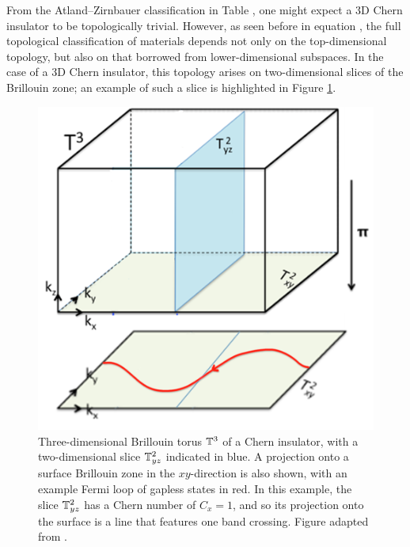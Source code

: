 From the Atland--Zirnbauer classification in Table \red{[reference]},%
one might expect a 3D Chern insulator to be topologically trivial. However, as seen before in equation ,%
the full topological classification of materials depends not only on the top-dimensional topology, but also on that borrowed from lower-dimensional subspaces. In the case of a 3D Chern insulator, this topology arises on two-dimensional slices of the Brillouin zone; an example of such a slice is highlighted in Figure \ref{fig:3D_Chern_insulator}.
\begin{figure}[htb!]
	\centering
	\includegraphics[width=.5\linewidth]{Images/3D_Chern_insulator}
	\caption{ Three-dimensional Brillouin torus $\mathbb{T}^3$ of a Chern insulator, with a two-dimensional slice $\mathbb{T}_{yz}^2$ indicated in blue. A projection onto a surface Brillouin zone in the $xy$-direction is also shown, with an example Fermi loop of gapless states in red. In this example, the slice $\mathbb{T}_{yz}^2$ has a Chern number of $C_{x} = 1$, and so its projection onto the surface is a line that features one band crossing. Figure adapted from \cite{Mathai_math-review}.}
	\label{fig:3D_Chern_insulator}
\end{figure}


